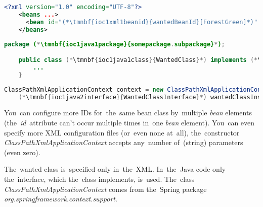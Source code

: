 \begin{lstlisting}[language=XML, title={Configuration XML}]
    <?xml version="1.0" encoding="UTF-8"?>
    <beans ...>
      <bean id="(*\tmnbf{ioc1xml1beanid}{wantedBeanId}[ForestGreen]*)" class="(*\tmnbf{ioc1xml1package}{somepackage.subpackage}[ForestGreen]*).(*\tmnbf{ioc1xml1class}{WantedClass}[ForestGreen]*)"/>
    </beans>
\end{lstlisting}
\begin{lstlisting}[language=Java, title={Wanted class}]
    package (*\tmnbf{ioc1java1package}{somepackage.subpackage}*);

    public class (*\tmnbf{ioc1java1class}{WantedClass}*) implements (*\tmnbf{ioc1java1interface}{WantedClassInterface}*) {
        ...
    }
\end{lstlisting}
\begin{lstlisting}[language=Java, title={Usage}]
    ClassPathXmlApplicationContext context = new ClassPathXmlApplicationContext("configurationFile.xml");
    (*\tmnbf{ioc1java2interface}{WantedClassInterface}*) wantedClassInstance = context.getBean("(*\tmnbf{ioc1java2beanid}{wantedBeanId}[ForestGreen]*)", (*\tmnbf{ioc1java2interface2}{WantedClassInterface}*).class);
\end{lstlisting}

\noindent You~can configure more IDs for~the~same bean class by~multiple \textit{bean} elements (the~\textit{id}~attribute can't occur multiple times in~one \textit{bean} element).
You~can even specify more XML configuration files (or~even none at~all), the~constructor \mbox{\textit{ClassPathXmlApplicationContext}} accepts any~number of~(string) parameters (even zero).

The~wanted class is~specified only in~the~XML\@.
In~the~Java code only the~interface, which the~class implements, is~used.
The~class \textit{ClassPathXmlApplicationContext} comes from the~Spring package \textit{org.springframework.context.support}.

